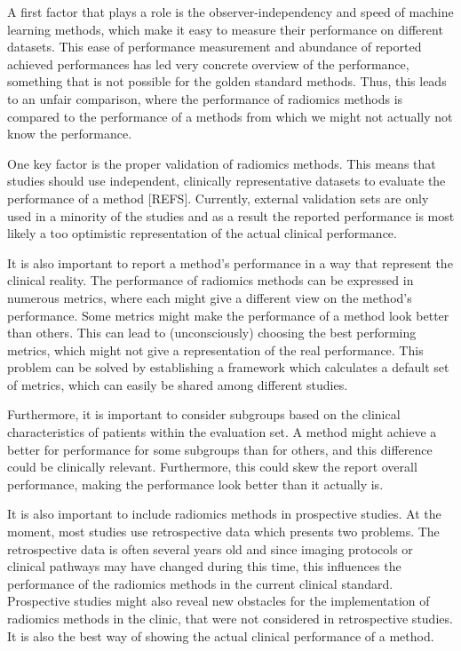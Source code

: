 A first factor that plays a role is the observer-independency and speed of machine learning methods, which make it easy to measure their performance on different datasets.
This ease of performance measurement and abundance of reported achieved performances has led very concrete overview of the performance, something that is not possible for the golden standard methods.
Thus, this leads to an unfair comparison, where the performance of radiomics methods is compared to the performance of a methods from which we might not actually not know the performance.


One key factor is the proper validation of radiomics methods.
This means that studies should use independent, clinically representative datasets to evaluate the performance of a method [REFS].
Currently, external validation sets are only used in a minority of the studies and as a result the reported performance is most likely a too optimistic representation of the actual clinical performance.

It is also important to report a method's performance in a way that represent the clinical reality.
The performance of radiomics methods can be expressed in numerous metrics, where each might give a different view on the method's performance.
Some metrics might make the performance of a method look better than others.
This can lead to (unconsciously) choosing the best performing metrics, which might not give a representation of the real performance.
This problem can be solved by establishing a framework which calculates a default set of metrics, which can easily be shared among different studies.

Furthermore, it is important to consider subgroups based on the clinical characteristics of patients within the evaluation set.
A method might achieve a better for performance for some subgroups than for others, and this difference could be clinically relevant.
Furthermore, this could skew the report overall performance, making the performance look better than it actually is.

It is also important to include radiomics methods in prospective studies.
At the moment, most studies use retrospective data which presents two problems.
The retrospective data is often several years old and since imaging protocols or clinical pathways may have changed during this time, this influences the performance of the radiomics methods in the current clinical standard.
Prospective studies might also reveal new obstacles for the implementation of radiomics methods in the clinic, that were not considered in retrospective studies.
It is also the best way of showing the actual clinical performance of a method.

